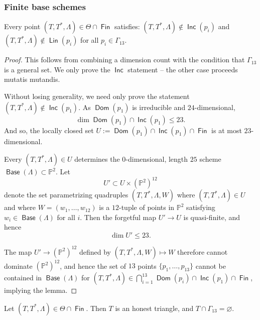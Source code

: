 \documentclass{article}
\renewcommand{\P}{\mathbb{P}}
\DeclareMathOperator{\Dom}{\mathsf{Dom}}
\DeclareMathOperator{\Fin}{\mathsf{Fin}}
\DeclareMathOperator{\Lin}{\mathsf{Lin}}
\DeclareMathOperator{\Inc}{\mathsf{Inc}}
\DeclareMathOperator{\Base}{\mathsf{Base}}
\begin{document}
\subsubsection{Finite base schemes}
\label{sec:understanding-s-cap}



\begin{lemma}
  \label{lemma:finite} Every point
  $(T, T^{*}, \Lambda) \in \Theta \cap \Fin$ satisfies:
  $(T,T^{*},\Lambda) \notin \Inc(p_{i})$ and
  $(T,T^{*},\Lambda) \notin \Lin(p_{i})$ for all
  $p_{i} \in \Gamma_{13}$.
\end{lemma}

\begin{proof}
  This follows from combining a dimension count with the condition
  that $\Gamma_{13}$ is a general set. We only prove the $\Inc$
  statement -- the other case proceeds mutatis mutandis.

  Without losing generality, we need only prove the statement
  $(T,T^{*},\Lambda) \notin \Inc(p_{1})$.  As $\Dom(p_1)$ is
  irreducible and $24$-dimensional,
  \[\dim \Dom(p_1) \cap \Inc(p_1)  \leq 23.\] And so, the locally closed
  set $U := \Dom(p_1) \cap \Inc(p_1) \cap \Fin$ is at most $23$-dimensional.

  Every $(T,T^{*},\Lambda) \in U$ determines the $0$-dimensional, length
  $25$ scheme $\Base(\Lambda) \subset \P^{2}$. Let
  \[U' \subset U \times (\P^{2})^{12}\] denote the set
  parametrizing quadruples $(T,T^{*},\Lambda,W)$ where
  $(T,T^{*},\Lambda) \in U$ and where $W = (w_1, \dots, w_{12})$ is a
  $12$-tuple of points in $\P^{2}$ satisfying $w_i \in \Base(\Lambda)$
  for all $i$. Then the forgetful map $U' \to U$ is quasi-finite, and
  hence \[\dim U' \leq 23.\]

  The map $U' \to (\P^{2})^{12}$ defined by
  $(T,T^{*}, \Lambda, W) \mapsto W$ therefore cannot dominate
  $(\P^{2})^{12}$, and hence the set of $13$  points
  $\{p_1, \dots, p_{13}\}$ cannot be contained in $\Base(\Lambda)$ for
  $(T,T^{*},\Lambda) \in \bigcap_{i=1}^{13}\Dom(p_{i}) \cap
  \Inc(p_{1}) \cap \Fin$, implying the lemma.
\end{proof}



\begin{lemma}
  \label{lemma:finitehonest}
  Let $(T,T^{*},\Lambda) \in \Theta \cap \Fin$. Then $T$ is an honest
  triangle, and $T \cap \Gamma_{13} = \varnothing$.
\end{lemma}
\end{document}
